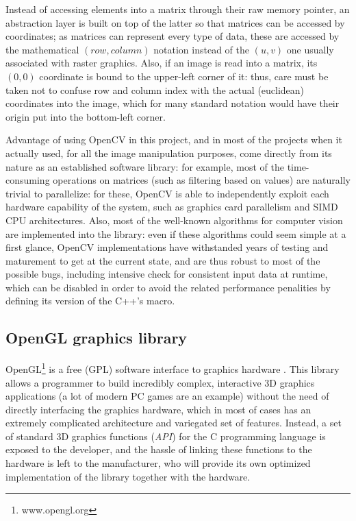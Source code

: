 Instead of accessing elements into a matrix through their raw memory
pointer, an abstraction layer is built on top of the latter so that
matrices can be accessed by coordinates; as matrices can represent
every type of data, these are accessed by the mathematical  $(row, column)$ notation
instead of the $(u,v)$ one usually associated with raster
graphics. Also, if an image is read into a matrix, its $(0,0)$
coordinate is bound to the upper-left corner of it: thus, care must be
taken not to confuse row and column index with the actual (euclidean)
coordinates into the image, which for many standard notation would
have their origin put into the bottom-left corner. 

Advantage of using OpenCV in this project, and in most of the projects
when it actually used, for all the image
manipulation purposes, come directly from its nature as an established
software library: for example, most of the time-consuming operations
on matrices (such as filtering based on values) are naturally trivial
to parallelize: for these, OpenCV is able to independently exploit
each hardware capability of the system, such as graphics card
parallelism and SIMD CPU architectures. Also, most of the well-known
algorithms for computer vision are implemented into the library: even
if these algorithms could seem simple at a first glance, OpenCV
implementations have withstanded years of testing and maturement to get
at the current state, and are thus robust to most of the possible
bugs, including intensive check for consistent input data at runtime,
which can be disabled in order to avoid the related performance
penalities by defining its version of the C++'s  macro.

\subsection{OpenGL graphics library} \label{sec:opengl-intro}
OpenGL\footnote{www.opengl.org} is a free (GPL) software interface to graphics hardware \cite{opengl-book}. This
library allows a programmer to build incredibly complex, interactive 3D graphics
applications (a lot of modern PC games are an example) without the need of
directly interfacing the graphics hardware, which in most of cases has an
extremely complicated architecture and variegated set of features. Instead, a
set of standard 3D graphics functions (\emph{API}) for the C programming
language is exposed to the developer, and the hassle of linking these
functions to the hardware is left to the manufacturer, who will provide its own
optimized implementation of the library together with the hardware.

